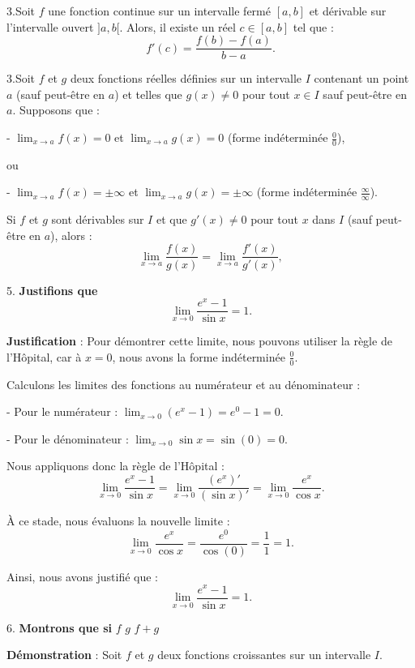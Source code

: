 \documentclass[12pt]{article}
\begin{document}
3.Soit \( f \) une fonction continue sur un intervalle fermé \([a, b]\) et dérivable sur l'intervalle ouvert \( ]a, b[ \). Alors, il existe un réel \( c \in [a, b] \) tel que :
\[
f'(c) = \frac{f(b) - f(a)}{b - a}.
\]

3.Soit \( f \) et \( g \) deux fonctions réelles définies sur un intervalle \( I \) contenant un point \( a \) (sauf peut-être en \( a \)) et telles que \( g(x) \neq 0 \) pour tout \( x \in I \) sauf peut-être en \( a \). Supposons que :

- \( \lim_{x \to a} f(x) = 0 \) et \( \lim_{x \to a} g(x) = 0 \) (forme indéterminée \( \frac{0}{0} \)), 

ou

- \( \lim_{x \to a} f(x) = \pm \infty \) et \( \lim_{x \to a} g(x) = \pm \infty \) (forme indéterminée \( \frac{\infty}{\infty} \)).

Si \( f \) et \( g \) sont dérivables sur \( I \) et que \( g'(x) \neq 0 \) pour tout \( x \) dans \( I \) (sauf peut-être en \( a \)), alors :
\[
\lim_{x \to a} \frac{f(x)}{g(x)} = \lim_{x \to a} \frac{f'(x)}{g'(x)},
\]

5. \textbf{Justifions que}
\[
\lim_{x \to 0} \frac{e^{x}-1}{\sin x} = 1.
\]

\textbf{Justification} : Pour démontrer cette limite, nous pouvons utiliser la règle de l'Hôpital, car à \( x = 0 \), nous avons la forme indéterminée \( \frac{0}{0} \).

Calculons les limites des fonctions au numérateur et au dénominateur :

- Pour le numérateur : \( \lim_{x \to 0} (e^{x} - 1) = e^{0} - 1 = 0 \).

- Pour le dénominateur : \( \lim_{x \to 0} \sin x = \sin(0) = 0 \).

Nous appliquons donc la règle de l'Hôpital :
\[
\lim_{x \to 0} \frac{e^{x}-1}{\sin x} = \lim_{x \to 0} \frac{(e^{x})'}{(\sin x)'} = \lim_{x \to 0} \frac{e^{x}}{\cos x}.
\]

À ce stade, nous évaluons la nouvelle limite :
\[
\lim_{x \to 0} \frac{e^{x}}{\cos x} = \frac{e^{0}}{\cos(0)} = \frac{1}{1} = 1.
\]

Ainsi, nous avons justifié que :
\[
\lim_{x \to 0} \frac{e^{x}-1}{\sin x} = 1.
\]

6. \textbf{Montrons que si } \( f \)  \( g \)  \( f + g \)\\ 

\textbf{Démonstration} : Soit \( f \) et \( g \) deux fonctions croissantes sur un intervalle \( I \).
\end{document}
